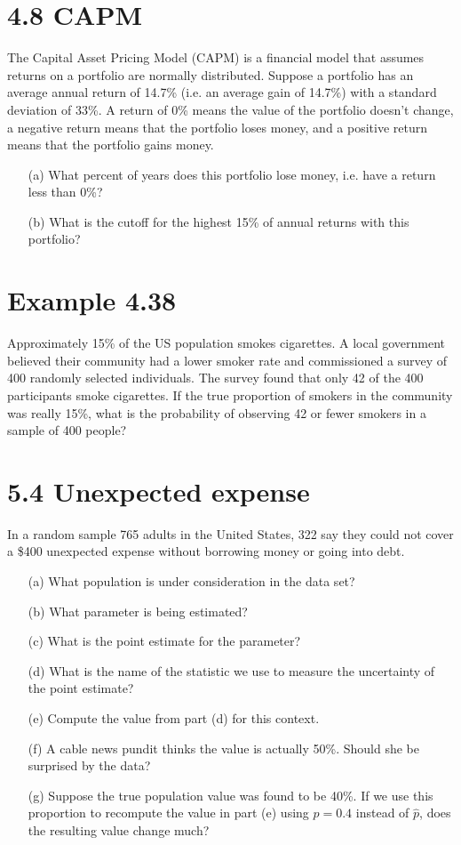 \documentclass{article}
\begin{document}
\section*{4.8 CAPM}
The Capital Asset Pricing Model (CAPM) is a financial model that assumes returns on a portfolio are normally distributed. Suppose a portfolio has an average annual return of 14.7\% (i.e. an average gain of 14.7\%) with a standard deviation of 33\%. A return of 0\% means the value of the portfolio doesn’t change, a negative return means that the portfolio loses money, and a positive return means that the portfolio gains money.
\begin{itemize}
    \item[(a)] What percent of years does this portfolio lose money, i.e. have a return less than 0\%?
    \item[(b)] What is the cutoff for the highest 15\% of annual returns with this portfolio?
\end{itemize}


\section*{Example 4.38}
Approximately 15\% of the US population smokes cigarettes. A local government believed their community had a lower smoker rate and commissioned a survey of 400 randomly selected individuals. The survey found that only 42 of the 400 participants smoke cigarettes. If the true proportion of smokers in the community was really 15\%, what is the probability of observing 42 or fewer smokers in a sample of 400 people?


\section*{5.4 Unexpected expense}
In a random sample 765 adults in the United States, 322 say they could not cover a \$400 unexpected expense without borrowing money or going into debt.
\begin{itemize}
    \item[(a)] What population is under consideration in the data set?
    \item[(b)] What parameter is being estimated?
    \item[(c)] What is the point estimate for the parameter?
    \item[(d)] What is the name of the statistic we use to measure the uncertainty of the point estimate?
    \item[(e)] Compute the value from part (d) for this context.
    \item[(f)] A cable news pundit thinks the value is actually 50\%. Should she be surprised by the data?
    \item[(g)] Suppose the true population value was found to be 40\%. If we use this proportion to recompute the value in part (e) using \(p = 0.4\) instead of \(\hat{p}\), does the resulting value change much?
\end{itemize}
\end{document}
